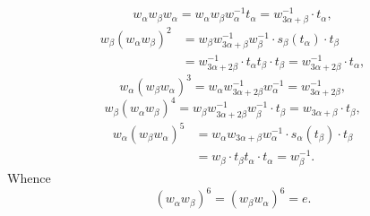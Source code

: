\[
w_\alpha w_\beta w_\alpha=w_\alpha w_\beta w_\alpha^{-1}t_\alpha=w_{3\alpha+\beta}^{-1}\cdot t_\alpha,
\]
\[
\begin{aligned}
w_\beta(w_\alpha w_\beta)^2
&=w_\beta w_{3\alpha+\beta}^{-1}w_\beta^{-1}\cdot s_\beta(t_\alpha)\cdot t_\beta\\
&=w_{3\alpha+2\beta}^{-1}\cdot t_\alpha t_\beta\cdot t_\beta=w_{3\alpha+2\beta}^{-1}\cdot t_\alpha,
\end{aligned}
\]
\[
w_\alpha(w_\beta w_\alpha)^3=w_\alpha w_{3\alpha+2\beta}^{-1}w_\alpha^{-1}=w_{3\alpha+2\beta}^{-1},
\]
\[
w_\beta(w_\alpha w_\beta)^4=w_\beta w_{3\alpha+2\beta}^{-1}w_\beta^{-1}\cdot t_\beta=w_{3\alpha+\beta}\cdot t_\beta,
\]
\[
\begin{aligned}
w_\alpha(w_\beta w_\alpha)^5
&=w_\alpha w_{3\alpha+\beta}w_\alpha^{-1}\cdot s_\alpha(t_\beta)\cdot t_\beta\\
&=w_\beta\cdot t_\beta t_\alpha\cdot t_\alpha=w_\beta^{-1}.
\end{aligned}
\]
Whence
\[
(w_\alpha w_\beta)^6=(w_\beta w_\alpha)^6=e.
\]

